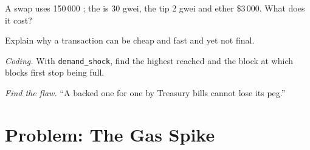 \begin{exercise}[$\star\star$]\label{exo:m3:blockchains-for-traders:5}
A swap uses 150\,000 ; the  is 30 gwei, the tip 2 gwei and ether \$3\,000. What does it cost?
\end{exercise}

\begin{exercise}[$\star\star$]\label{exo:m3:blockchains-for-traders:6}
Explain why a  transaction can be cheap and fast and yet not final.
\end{exercise}

\begin{exercise}[$\star\star\star$]\label{exo:m3:blockchains-for-traders:7}
\emph{Coding.} With \texttt{demand\_shock}, find the highest  reached and the block at which blocks first
stop being full.
\end{exercise}

\begin{exercise}[$\star\star\star$]\label{exo:m3:blockchains-for-traders:8}
\emph{Find the flaw.} ``A  backed one for one by Treasury bills cannot lose its peg.''
\end{exercise}

\section{Problem: The Gas Spike}

